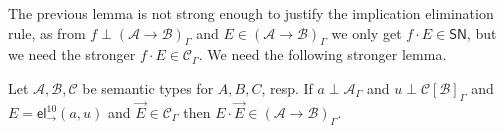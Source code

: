 \documentclass[a4paper,USenglish,cleveref, autoref, thm-restate]{lipics-v2019}
\newcommand{\tel}{\mathsf{el}}
\newcommand{\el}[2]{\ensuremath{\tel_{#1}^{#2}}}
\newcommand{\A}{\mathcal{A}}
\newcommand{\B}{\mathcal{B}}
\newcommand{\C}{\mathcal{C}}
\newcommand{\SN}{\mathsf{SN}}
\begin{document}
The previous lemma is not strong enough to justify the implication
elimination rule, as from $f \perp (\A \to \B)_\Gamma$ and $E \in (\A
\to \B)_\Gamma$ we only get $f \cdot E \in \SN$, but we need the
stronger $f \cdot E \in \C_\Gamma$.
We need the following stronger lemma.

\begin{lemma}
  \label{lem:appprev}
  Let $\A,\B,\C$ be semantic types for $A,B,C$, resp.  If
  $a \perp \A_\Gamma$ and $u \perp \C[\B]_\Gamma$ and
  $E = \el\to{10}(a,u)$ and $\vec E \in \C_\Gamma$ then
  $E \cdot \vec E \in (\A \to \B)_\Gamma$.
\end{lemma}
\end{document}
